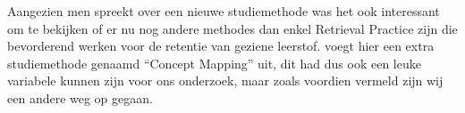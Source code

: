 \documentclass{hogent-article}
\begin{document}
Aangezien men spreekt over een nieuwe studiemethode was het ook interessant om te bekijken of er nu nog andere methodes dan enkel Retrieval Practice zijn die bevorderend werken voor de retentie van geziene leerstof. \cite{JeffreyKarpicke2011} voegt hier een extra studiemethode genaamd ``Concept Mapping'' uit, dit had dus ook een leuke variabele kunnen zijn voor ons onderzoek, maar zoals voordien vermeld zijn wij een andere weg op gegaan.


\printbibliography[heading=bibintoc]
\end{document}
